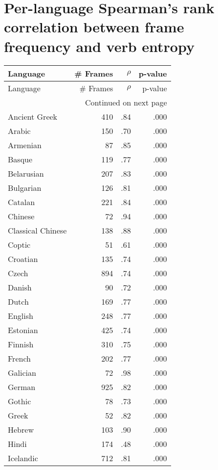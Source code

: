 \section{Per-language Spearman's rank correlation between frame frequency and verb entropy}\label{appendix:exp4-corr}
\begin{longtable}{lrrr}
    \toprule
    Language & \# Frames & $\rho$ & p-value \\
    \midrule
    \endfirsthead
    \toprule
    Language & \# Frames & $\rho$ & p-value \\
    \midrule
    \endhead
    \midrule
    \multicolumn{4}{r}{Continued on next page} \\
    \midrule
    \endfoot
    \bottomrule
    \endlastfoot
    Ancient Greek & 410 & .84 & .000 \\
    Arabic & 150 & .70 & .000 \\
    Armenian & 87 & .85 & .000 \\
    Basque & 119 & .77 & .000 \\
    Belarusian & 207 & .83 & .000 \\
    Bulgarian & 126 & .81 & .000 \\
    Catalan & 221 & .84 & .000 \\
    Chinese & 72 & .94 & .000 \\
    Classical Chinese & 138 & .88 & .000 \\
    Coptic & 51 & .61 & .000 \\
    Croatian & 135 & .74 & .000 \\
    Czech & 894 & .74 & .000 \\
    Danish & 90 & .72 & .000 \\
    Dutch & 169 & .77 & .000 \\
    English & 248 & .77 & .000 \\
    Estonian & 425 & .74 & .000 \\
    Finnish & 310 & .75 & .000 \\
    French & 202 & .77 & .000 \\
    Galician & 72 & .98 & .000 \\
    German & 925 & .82 & .000 \\
    Gothic & 78 & .73 & .000 \\
    Greek & 52 & .82 & .000 \\
    Hebrew & 103 & .90 & .000 \\
    Hindi & 174 & .48 & .000 \\
    Icelandic & 712 & .81 & .000 \\

\end{longtable}
